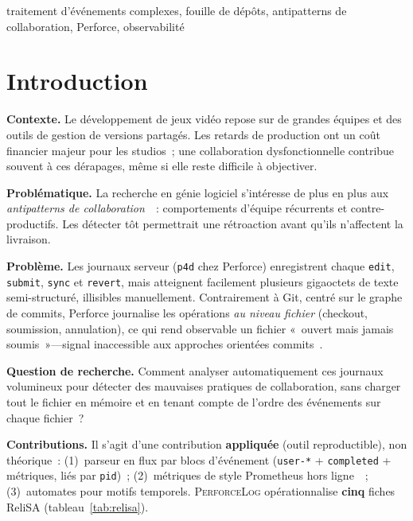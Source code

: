 \documentclass[conference]{IEEEtran}
\newcommand{\toolname}{\textsc{PerforceLog}}
\begin{document}
\begin{IEEEkeywords}
traitement d'événements complexes, fouille de dépôts, antipatterns de
collaboration, Perforce, observabilité
\end{IEEEkeywords}

\section{Introduction}

\textbf{Contexte.}
Le développement de jeux vidéo repose sur de grandes équipes et des
outils de gestion de versions partagés. Les retards de production ont un
coût financier majeur pour les studios~; une collaboration dysfonctionnelle
contribue souvent à ces dérapages, même si elle reste difficile à
objectiver.

\textbf{Problématique.}
La recherche en génie logiciel s'intéresse de plus en plus aux
\emph{antipatterns de collaboration}~\cite{brown1998antipatterns,tamburri2019community,relisa_catalogue}~:
comportements d'équipe récurrents et contre-productifs. Les détecter tôt
permettrait une rétroaction avant qu'ils n'affectent la livraison.

\textbf{Problème.}
Les journaux serveur (\texttt{p4d} chez Perforce) enregistrent chaque
\texttt{edit}, \texttt{submit}, \texttt{sync} et \texttt{revert}, mais
atteignent facilement plusieurs gigaoctets de texte semi-structuré,
illisibles manuellement. Contrairement à Git, centré sur le graphe de
commits, Perforce journalise les opérations \emph{au niveau fichier}
(checkout, soumission, annulation), ce qui rend observable un fichier
«~ouvert mais jamais soumis~»---signal inaccessible aux approches
orientées commits~\cite{hindle2008mining}.

\textbf{Question de recherche.}
Comment analyser automatiquement ces journaux volumineux pour détecter
des mauvaises pratiques de collaboration, sans charger tout le fichier en
mémoire et en tenant compte de l'ordre des événements sur chaque
fichier~?

\textbf{Contributions.}
Il s'agit d'une contribution \textbf{appliquée} (outil reproductible),
non théorique~: (1)~parseur en flux par blocs d'événement
(\texttt{user-*} + \texttt{completed} + métriques, liés par
\texttt{pid})~; (2)~métriques de style Prometheus hors
ligne~\cite{openmetrics}~; (3)~automates pour motifs temporels.
\toolname{} opérationnalise \textbf{cinq} fiches ReliSA
(tableau~\ref{tab:relisa}).
\end{document}
